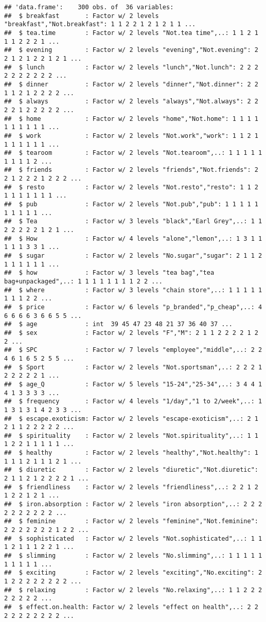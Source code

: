 \documentclass[]{article}
\begin{document}
\begin{verbatim}
## 'data.frame':    300 obs. of  36 variables:
##  $ breakfast       : Factor w/ 2 levels "breakfast","Not.breakfast": 1 1 2 2 1 2 1 2 1 1 ...
##  $ tea.time        : Factor w/ 2 levels "Not.tea time",..: 1 1 2 1 1 1 2 2 2 1 ...
##  $ evening         : Factor w/ 2 levels "evening","Not.evening": 2 2 1 2 1 2 2 1 2 1 ...
##  $ lunch           : Factor w/ 2 levels "lunch","Not.lunch": 2 2 2 2 2 2 2 2 2 2 ...
##  $ dinner          : Factor w/ 2 levels "dinner","Not.dinner": 2 2 1 1 2 1 2 2 2 2 ...
##  $ always          : Factor w/ 2 levels "always","Not.always": 2 2 2 2 1 2 2 2 2 2 ...
##  $ home            : Factor w/ 2 levels "home","Not.home": 1 1 1 1 1 1 1 1 1 1 ...
##  $ work            : Factor w/ 2 levels "Not.work","work": 1 1 2 1 1 1 1 1 1 1 ...
##  $ tearoom         : Factor w/ 2 levels "Not.tearoom",..: 1 1 1 1 1 1 1 1 1 2 ...
##  $ friends         : Factor w/ 2 levels "friends","Not.friends": 2 2 1 2 2 2 1 2 2 2 ...
##  $ resto           : Factor w/ 2 levels "Not.resto","resto": 1 1 2 1 1 1 1 1 1 1 ...
##  $ pub             : Factor w/ 2 levels "Not.pub","pub": 1 1 1 1 1 1 1 1 1 1 ...
##  $ Tea             : Factor w/ 3 levels "black","Earl Grey",..: 1 1 2 2 2 2 2 1 2 1 ...
##  $ How             : Factor w/ 4 levels "alone","lemon",..: 1 3 1 1 1 1 1 3 3 1 ...
##  $ sugar           : Factor w/ 2 levels "No.sugar","sugar": 2 1 1 2 1 1 1 1 1 1 ...
##  $ how             : Factor w/ 3 levels "tea bag","tea bag+unpackaged",..: 1 1 1 1 1 1 1 1 2 2 ...
##  $ where           : Factor w/ 3 levels "chain store",..: 1 1 1 1 1 1 1 1 2 2 ...
##  $ price           : Factor w/ 6 levels "p_branded","p_cheap",..: 4 6 6 6 6 3 6 6 5 5 ...
##  $ age             : int  39 45 47 23 48 21 37 36 40 37 ...
##  $ sex             : Factor w/ 2 levels "F","M": 2 1 1 2 2 2 2 1 2 2 ...
##  $ SPC             : Factor w/ 7 levels "employee","middle",..: 2 2 4 6 1 6 5 2 5 5 ...
##  $ Sport           : Factor w/ 2 levels "Not.sportsman",..: 2 2 2 1 2 2 2 2 2 1 ...
##  $ age_Q           : Factor w/ 5 levels "15-24","25-34",..: 3 4 4 1 4 1 3 3 3 3 ...
##  $ frequency       : Factor w/ 4 levels "1/day","1 to 2/week",..: 1 1 3 1 3 1 4 2 3 3 ...
##  $ escape.exoticism: Factor w/ 2 levels "escape-exoticism",..: 2 1 2 1 1 2 2 2 2 2 ...
##  $ spirituality    : Factor w/ 2 levels "Not.spirituality",..: 1 1 1 2 2 1 1 1 1 1 ...
##  $ healthy         : Factor w/ 2 levels "healthy","Not.healthy": 1 1 1 1 2 1 1 1 2 1 ...
##  $ diuretic        : Factor w/ 2 levels "diuretic","Not.diuretic": 2 1 1 2 1 2 2 2 2 1 ...
##  $ friendliness    : Factor w/ 2 levels "friendliness",..: 2 2 1 2 1 2 2 1 2 1 ...
##  $ iron.absorption : Factor w/ 2 levels "iron absorption",..: 2 2 2 2 2 2 2 2 2 2 ...
##  $ feminine        : Factor w/ 2 levels "feminine","Not.feminine": 2 2 2 2 2 2 2 1 2 2 ...
##  $ sophisticated   : Factor w/ 2 levels "Not.sophisticated",..: 1 1 1 2 1 1 1 2 2 1 ...
##  $ slimming        : Factor w/ 2 levels "No.slimming",..: 1 1 1 1 1 1 1 1 1 1 ...
##  $ exciting        : Factor w/ 2 levels "exciting","No.exciting": 2 1 2 2 2 2 2 2 2 2 ...
##  $ relaxing        : Factor w/ 2 levels "No.relaxing",..: 1 1 2 2 2 2 2 2 2 2 ...
##  $ effect.on.health: Factor w/ 2 levels "effect on health",..: 2 2 2 2 2 2 2 2 2 2 ...
\end{verbatim}
\end{document}
